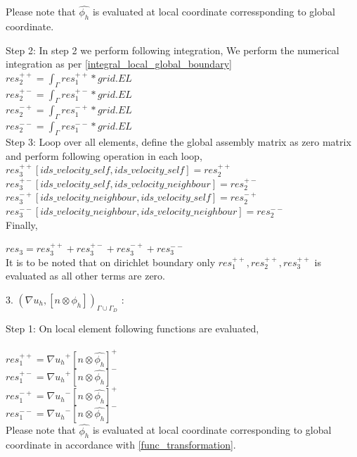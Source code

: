 \documentclass[a4paper,12pt]{book}
\begin{document}
Please note that $\hat{\phi_h}$ is evaluated at local coordinate corressponding to global coordinate.

Step 2: In step 2 we perform following integration, 
We perform the numerical integration as per \ref{integral_local_global_boundary}
\\ 
$res_2^{++} = \int_{\Gamma} res_1^{++} * grid.EL$\\
$res_2^{+-} = \int_{\Gamma} res_1^{+-} * grid.EL$\\
$res_2^{-+} = \int_{\Gamma} res_1^{-+} * grid.EL$\\
$res_2^{--} = \int_{\Gamma} res_1^{--} * grid.EL$\\

Step 3: Loop over all elements, define the global assembly matrix as zero matrix and perform following operation in each loop,
\\
$res_3^{++}[ids\_velocity\_self,ids\_velocity\_self] = res_2^{++}$\\
$res_3^{+-}[ids\_velocity\_self,ids\_velocity\_neighbour] = res_2^{+-}$\\
$res_3^{-+}[ids\_velocity\_neighbour,ids\_velocity\_self] = res_2^{-+}$\\
$res_3^{--}[ids\_velocity\_neighbour,ids\_velocity\_neighbour] = res_2^{--}$\\

Finally,

$res_3 = res_3^{++} + res_3^{+-} + res_3^{-+} + res_3^{--}$\\

It is to be noted that on dirichlet boundary only $res_1^{++}, res_2^{++}, res_3^{++}$ is evaluated as all other terms are zero.

3. $({\nabla u_h}, [n \otimes \phi_h])_{\Gamma \cup \Gamma_D}$ :

Step 1: On local element following functions are evaluated,\\
\\
$res_1^{++} = {\nabla u_h}^+ [n \otimes \hat{\phi_h}]^+$\\
$res_1^{+-} = {\nabla u_h}^+ [n \otimes \hat{\phi_h}]^-$\\
$res_1^{-+} = {\nabla u_h}^- [n \otimes \hat{\phi_h}]^+$\\
$res_1^{--} = {\nabla u_h}^- [n \otimes \hat{\phi_h}]^-$\\

Please note that $\hat{\phi_h}$ is evaluated at local coordinate corresponding to global coordinate in accordance with \ref{func_transformation}.
\end{document}
